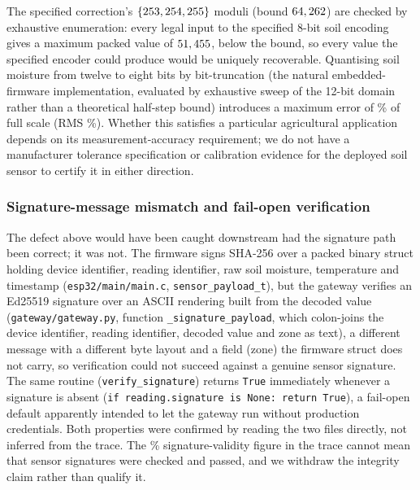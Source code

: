 The specified correction's $\{253, 254, 255\}$ moduli (bound $64,262$) are checked by exhaustive enumeration: every legal input to the specified 8-bit soil encoding gives a maximum packed value of $51,455$, below the bound, so every value the specified encoder could produce would be uniquely recoverable. Quantising soil moisture from twelve to eight bits by bit-truncation (the natural embedded-firmware implementation, evaluated by exhaustive sweep of the 12-bit domain rather than a theoretical half-step bound) introduces a maximum error of \QuantMaxErrorPct\% of full scale (RMS \QuantRmsErrorPct\%). Whether this satisfies a particular agricultural application depends on its measurement-accuracy requirement; we do not have a manufacturer tolerance specification or calibration evidence for the deployed soil sensor to certify it in either direction.

\subsubsection{Signature-message mismatch and fail-open verification}
\label{sec:sig-audit}

The defect above would have been caught downstream had the signature path been correct; it was not. The firmware signs SHA-256 over a packed binary struct holding device identifier, reading identifier, raw soil moisture, temperature and timestamp (\texttt{esp32/main/main.c}, \texttt{sensor\_payload\_t}), but the gateway verifies an Ed25519 signature over an ASCII rendering built from the decoded value (\texttt{gateway/gateway.py}, function \texttt{\_signature\_payload}, which colon-joins the device identifier, reading identifier, decoded value and zone as text), a different message with a different byte layout and a field (zone) the firmware struct does not carry, so verification could not succeed against a genuine sensor signature. The same routine (\texttt{verify\_signature}) returns \texttt{True} immediately whenever a signature is absent (\texttt{if reading.signature is None: return True}), a fail-open default apparently intended to let the gateway run without production credentials. Both properties were confirmed by reading the two files directly, not inferred from the trace. The \SignatureValidPct\% signature-validity figure in the trace cannot mean that sensor signatures were checked and passed, and we withdraw the integrity claim rather than qualify it.

